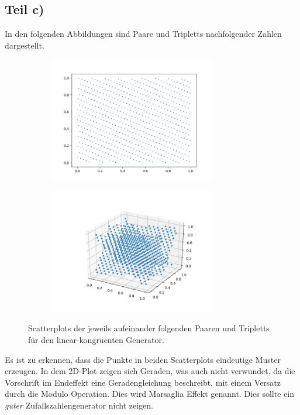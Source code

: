 \subsection{Teil c)}
In den folgenden Abbildungen sind Paare und Tripletts nachfolgender Zahlen dargestellt.
\begin{figure}[H]
  \begin{subfigure}{0.5\textwidth}
   \centering
   \includegraphics[width=0.8\textwidth]{plots/Paare2c.png}
   \label{fig:Paare2c}
\end{subfigure}
\begin{subfigure}{0.5\textwidth}
  \centering
  \includegraphics[width=0.8\textwidth]{plots/Triplets2c.png}
  \label{fig:Tripletts2c}
\end{subfigure}
\caption{Scatterplots der jeweils aufeinander folgenden Paaren und Tripletts für
          den linear-kongruenten Generator.}
\end{figure}
Es ist zu erkennen, dass die Punkte in beiden Scatterplots eindeutige Muster
erzeugen. In dem 2D-Plot zeigen sich Geraden, was auch nicht verwundet, da
die Vorschrift im Endeffekt eine Geradengleichung beschreibt, mit einem Versatz
durch die Modulo Operation. Dies wird Marsaglia Effekt genannt. Dies sollte ein
\textit{guter} Zufallszahlengenerator nicht zeigen.
